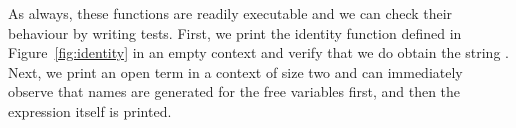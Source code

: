 As always, these functions are readily executable and we can check
their behaviour by writing tests. First, we print the identity function
defined in Figure~\ref{fig:identity}
in an empty context and verify that we do obtain the string .
Next, we print an open term in a context of size two and can immediately
observe that names are generated for the free variables first, and then the
expression itself is printed.

\begin{minipage}[t]{0.45\textwidth}
  \begin{agdasnippet}
  \end{agdasnippet}
\end{minipage}
\begin{minipage}[t]{0.45\textwidth}
  \begin{agdasnippet}
  \end{agdasnippet}
\end{minipage}
